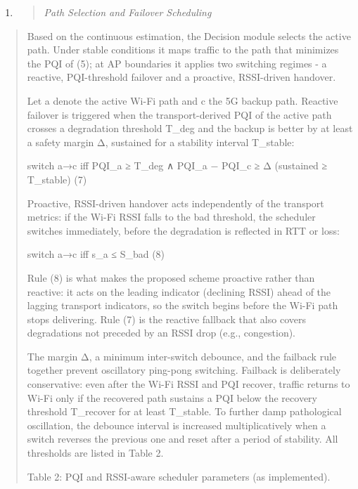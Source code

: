 \begin{enumerate}
\def\labelenumi{\arabic{enumi}.}
\setcounter{enumi}{3}
\item
  \begin{quote}
  \emph{Path Selection and Failover Scheduling}
  \end{quote}
\end{enumerate}

\begin{quote}
Based on the continuous estimation, the Decision module selects the active path. Under stable conditions it maps traffic to the path that minimizes the PQI of (5); at AP boundaries it applies two switching regimes - a reactive, PQI-threshold failover and a proactive, RSSI-driven handover.

Let a denote the active Wi-Fi path and c the 5G backup path. Reactive failover is triggered when the transport-derived PQI of the active path crosses a degradation threshold T\_deg and the backup is better by at least a safety margin Δ, sustained for a stability interval T\_stable:

switch a→c iff PQI\_a ≥ T\_deg ∧ PQI\_a − PQI\_c ≥ Δ (sustained ≥ T\_stable) (7)

Proactive, RSSI-driven handover acts independently of the transport metrics: if the Wi-Fi RSSI falls to the \textquotesingle bad\textquotesingle{} threshold, the scheduler switches immediately, before the degradation is reflected in RTT or loss:

switch a→c iff s\_a ≤ S\_bad (8)

Rule (8) is what makes the proposed scheme proactive rather than reactive: it acts on the leading indicator (declining RSSI) ahead of the lagging transport indicators, so the switch begins before the Wi-Fi path stops delivering. Rule (7) is the reactive fallback that also covers degradations not preceded by an RSSI drop (e.g., congestion).

The margin Δ, a minimum inter-switch debounce, and the failback rule together prevent oscillatory \textquotesingle ping-pong\textquotesingle{} switching. Failback is deliberately conservative: even after the Wi-Fi RSSI and PQI recover, traffic returns to Wi-Fi only if the recovered path sustains a PQI below the recovery threshold T\_recover for at least T\_stable. To further damp pathological oscillation, the debounce interval is increased multiplicatively when a switch reverses the previous one and reset after a period of stability. All thresholds are listed in Table 2.

Table 2: PQI and RSSI-aware scheduler parameters (as implemented).
\end{quote}

